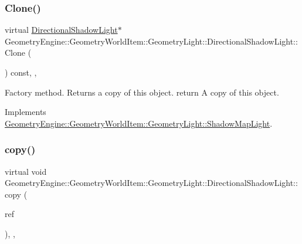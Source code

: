 \subsubsection{\texorpdfstring{Clone()}{Clone()}}
{\footnotesize\ttfamily virtual \mbox{\hyperlink{class_geometry_engine_1_1_geometry_world_item_1_1_geometry_light_1_1_directional_shadow_light}{Directional\+Shadow\+Light}}$\ast$ Geometry\+Engine\+::\+Geometry\+World\+Item\+::\+Geometry\+Light\+::\+Directional\+Shadow\+Light\+::\+Clone (\begin{DoxyParamCaption}{ }\end{DoxyParamCaption}) const\hspace{0.3cm}{\ttfamily [inline]}, {\ttfamily [override]}, {\ttfamily [virtual]}}

Factory method. Returns a copy of this object. return A copy of this object. 

Implements \mbox{\hyperlink{class_geometry_engine_1_1_geometry_world_item_1_1_geometry_light_1_1_shadow_map_light_a48eb6af2e6bb8487568ee4265fbc49ee}{Geometry\+Engine\+::\+Geometry\+World\+Item\+::\+Geometry\+Light\+::\+Shadow\+Map\+Light}}.

\mbox{\label{class_geometry_engine_1_1_geometry_world_item_1_1_geometry_light_1_1_directional_shadow_light_a9dfe76fbcd9c6f7047d99d7eff78c6a5}} 
\subsubsection{\texorpdfstring{copy()}{copy()}}
{\footnotesize\ttfamily virtual void Geometry\+Engine\+::\+Geometry\+World\+Item\+::\+Geometry\+Light\+::\+Directional\+Shadow\+Light\+::copy (\begin{DoxyParamCaption}\item[{const \mbox{\hyperlink{class_geometry_engine_1_1_geometry_world_item_1_1_geometry_light_1_1_directional_shadow_light}{Directional\+Shadow\+Light}} \&}]{ref }\end{DoxyParamCaption})\hspace{0.3cm}{\ttfamily [inline]}, {\ttfamily [protected]}, {\ttfamily [virtual]}}

